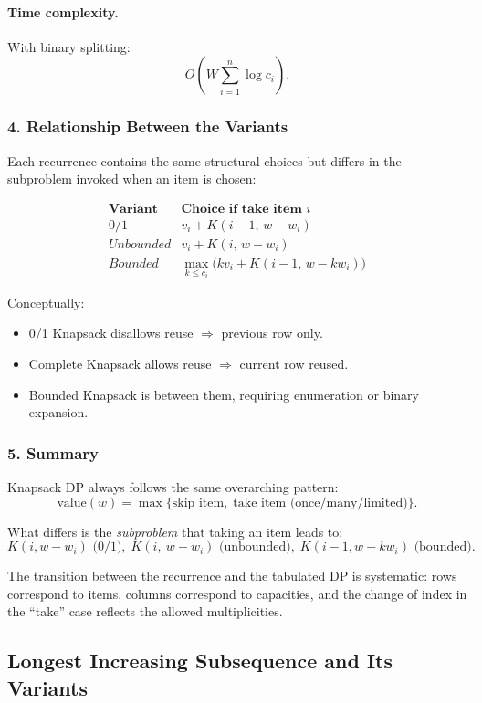 \documentclass[9pt]{extarticle}
\begin{document}
\paragraph{Time complexity.}
With binary splitting:  
\[
O\!\left(W \sum_{i=1}^n \log c_i\right).
\]

\subsubsection*{4. Relationship Between the Variants}

Each recurrence contains the same structural choices but differs in the 
subproblem invoked when an item is chosen:

\[
\begin{array}{c|c}
\textbf{Variant} & \textbf{Choice if take item $i$} \\ \hline
0/1 & v_i + K(i-1,\, w-w_i) \\[4pt]
Unbounded & v_i + K(i,\, w-w_i) \\[4pt]
Bounded & \max_{k\le c_i} \bigl(k v_i + K(i-1,\, w-k w_i)\bigr)
\end{array}
\]

Conceptually:
\begin{itemize}
    \item 0/1 Knapsack disallows reuse $\Rightarrow$ previous row only.
    \item Complete Knapsack allows reuse $\Rightarrow$ current row reused.
    \item Bounded Knapsack is between them, requiring enumeration or binary expansion.
\end{itemize}

\subsubsection*{5. Summary}

Knapsack DP always follows the same overarching pattern:
\[
\text{value}(w) = \max \{\text{skip item},\;\text{take item (once/many/limited)}\}.
\]

What differs is the \emph{subproblem} that taking an item leads to:
\[
K(i,w-w_i) \text{ (0/1)},\;
K(i,\ w-w_i) \text{ (unbounded)},\;
K(i-1,w-k w_i) \text{ (bounded)}.
\]

The transition between the recurrence and the tabulated DP is systematic:
rows correspond to items, columns correspond to capacities, and 
the change of index in the “take” case reflects the allowed multiplicities.

\subsection{Longest Increasing Subsequence and Its Variants}
\end{document}
